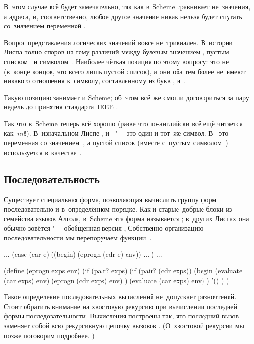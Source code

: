 В~этом случае всё будет замечательно, так как  в~Scheme сравнивает
не~значения, а адреса, и, соответственно, любое другое значение никак нельзя
будет спутать со~значением переменной .

\indexC{()}
Вопрос представления логических значений вовсе не~тривиален. В~истории Лиспа
полно споров на тему различий между булевым значением , пустым
списком~\ic{()} и символом~. Наиболее чёткая позиция по этому вопросу:
 это не~\ic{()} (в~конце концов, это всего лишь пустой список), и они
оба тем более не~имеют никакого отношения к~символу, составленному из букв
,  и~.

Такую позицию занимает и Scheme; об~этом всё~же смогли договориться за пару
недель до принятия стандарта~IEEE \cite{iee91}.

Так что в~Scheme теперь всё хорошо (разве что \ic{()} по-английски всё ещё
читается как~\emph{nil}!). В~изначальном Лиспе , \ic{()} и~
"--- это один и тот~же символ. В~{\LeLisp}  это переменная со
значением~\ic{()}, а пустой список (вместе с~пустым символом~\ic{||})
используется в~качестве~.


\subsection{Последовательность}\label{basics/evaluating-forms/ssect:sequence}

Существует специальная форма, позволяющая вычислить группу форм последовательно
и в~определённом порядке. Как и старые~добрые блоки  из
семейства языков Алгола, в~Scheme эта форма называется ; в~других
Лиспах она обычно зовётся  "--- обобщенная версия ,
 {\itd} Собственно организацию последовательности мы перепоручаем
функции~.

\begin{code:lisp}
... (case (car e)
      ((begin) (eprogn (cdr e) env)) ... ) ...

(define (eprogn exps env)
  (if (pair? exps)
      (if (pair? (cdr exps))
          (begin (evaluate (car exps) env)
                 (eprogn (cdr exps) env) )
          (evaluate (car exps) env) )
      '() ) )
\end{code:lisp}

Такое определение последовательных вычислений не~допускает разночтений. Стоит
обратить внимание на хвостовую рекурсию при вычислении последней формы
последовательности. Вычисления построены так, что последний вызов 
заменяет собой всю рекурсивную цепочку вызовов . (О~хвостовой
рекурсии мы позже поговорим подробнее.
)

